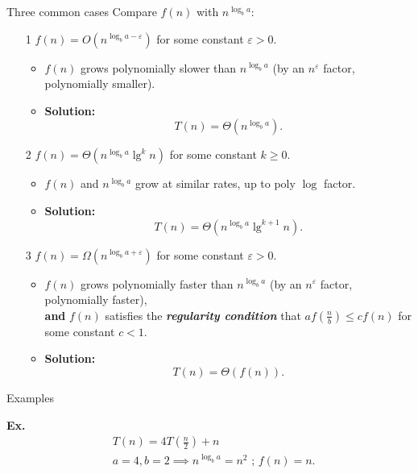 \documentclass{beamer}
\begin{document}
\begin{frame}{Three common cases}
    Compare $f(n)$ with $n^{\log_b a}$: \pause
    \begin{enumerate}
        \item[1] $f(n) = O\left(n^{\log_b a - \varepsilon} \right)$ for some constant $\varepsilon > 0$.
        \begin{itemize}
            \item $f(n)$ grows polynomially slower than $n^{\log_b a}$ (by an $n^\varepsilon$ factor, polynomially smaller).
            \item \textbf{Solution:} 
                $$
                    T(n) = \Theta(n^{\log_b a}).
                $$
        \end{itemize} \pause
        \item[2] $f(n) = \Theta(n^{\log_b a} \lg^k n)$ for some constant $k \geq 0$.
        \begin{itemize}
            \item $f(n)$ and $n^{\log_b a}$ grow at similar rates, up to poly $\log$ factor.
            \item \textbf{Solution:} 
                $$
                    T(n) = \Theta(n^{\log_b a} \lg^{k+1} n).
                $$
        \end{itemize} \pause
        \item[3] $f(n) = \Omega(n^{\log_b a + \varepsilon})$ for some constant $\varepsilon > 0$.
        \begin{itemize}
            \item $f(n)$ grows polynomially faster than $n^{\log_b a}$ (by an $n^\varepsilon$ factor, polynomially faster), \\
            \textbf{and} $f(n)$ satisfies the \textbf{\textit{regularity condition}} that $af\left(\frac{n}{b}\right) \leq cf(n)$ for some constant $c < 1$. 
            \item \textbf{Solution:} 
                $$
                    T(n) = \Theta(f(n)).
                $$
        \end{itemize}
    \end{enumerate}
\end{frame}

\begin{frame}{Examples}
    \begin{exampleblock}{\textbf{Ex.}}
        \vspace{-8mm}
        \begin{align*}
            & T(n) = 4T\left(\frac{n}{2} \right) + n \\
            & a = 4, b = 2 \implies n^{\log_b a} = n^2 \text{ ; } f(n) = n \text{.} \\
        \end{align*}
    \end{exampleblock}
\end{frame}
\end{document}
